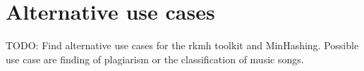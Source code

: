 \section{Alternative use cases}

TODO: Find alternative use cases for the rkmh toolkit and MinHashing. Possible use case are finding of plagiarism or the classification of music songs.\\